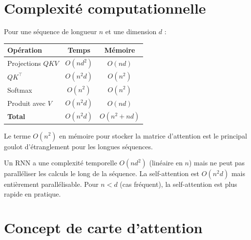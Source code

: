 \section{Complexit\'e computationnelle}
\label{sec:attention-complexity}

\begin{theoreme}
Pour une s\'equence de longueur $n$ et une dimension $d$ :
\begin{center}
\begin{tabular}{lcc}
\toprule
\textbf{Op\'eration} & \textbf{Temps} & \textbf{M\'emoire} \\
\midrule
Projections $QKV$ & $O(n d^2)$ & $O(n d)$ \\
$Q K^\top$ & $O(n^2 d)$ & $O(n^2)$ \\
Softmax & $O(n^2)$ & $O(n^2)$ \\
Produit avec $V$ & $O(n^2 d)$ & $O(n d)$ \\
\midrule
\textbf{Total} & $O(n^2 d)$ & $O(n^2 + n d)$ \\
\bottomrule
\end{tabular}
\end{center}
Le terme $O(n^2)$ en m\'emoire pour stocker la matrice d'attention est le
principal goulot d'\'etranglement pour les longues s\'equences.
\end{theoreme}

\begin{remarque}
Un RNN a une complexit\'e temporelle $O(n d^2)$ (lin\'eaire en $n$) mais ne
peut pas parall\'eliser les calculs le long de la s\'equence. La self-attention
est $O(n^2 d)$ mais enti\`erement parall\'elisable. Pour $n < d$ (cas
fr\'equent), la self-attention est plus rapide en pratique.
\end{remarque}

\section{Concept de carte d'attention}
\label{sec:attention-heatmap}

